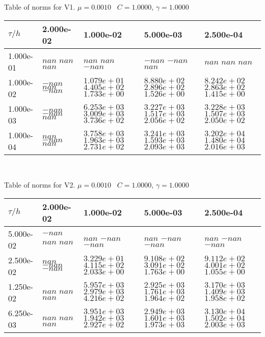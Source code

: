 \begin{center}
	Table of norms for V1. $\mu = 0.0010$ \, $C = 1.0000$, $\gamma = 1.0000$
	
	\begin{tabular}{|p{1in}|p{1in}|p{1in}|p{1in}|p{1in}|} \hline
		$\tau / h$ &2.000e-02 &1.000e-02 &5.000e-03 &2.500e-04 \\ \hline 
		1.000e-01 & $nan$  $nan$  $nan$  & $nan$  $nan$  $-nan$  & $-nan$  $-nan$  $nan$  & $nan$  $nan$  $nan$  \\ \hline 
		1.000e-02 & $-nan$  $nan$  $-nan$  & $1.079e+01$  $4.405e+02$  $1.733e+00$  & $8.880e+02$  $2.896e+02$  $1.526e+00$  & $8.242e+02$  $2.863e+02$  $1.415e+00$  \\ \hline 
		1.000e-03 & $-nan$  $-nan$  $nan$  & $6.253e+03$  $3.009e+03$  $3.736e+02$  & $3.227e+03$  $1.517e+03$  $2.056e+02$  & $3.228e+03$  $1.507e+03$  $2.050e+02$  \\ \hline 
		1.000e-04 & $nan$  $-nan$  $nan$  & $3.758e+03$  $1.963e+03$  $2.731e+02$  & $3.241e+03$  $1.593e+03$  $2.093e+03$  & $3.202e+04$  $1.480e+04$  $2.016e+03$  \\ \hline 
		
	\end{tabular}\\[20pt]
\end{center}

\newpage
\begin{center}
	Table of norms for V2. $\mu = 0.0010$ \, $C = 1.0000$, $\gamma = 1.0000$
	
	\begin{tabular}{|p{1in}|p{1in}|p{1in}|p{1in}|p{1in}|} \hline
		$\tau / h$ &2.000e-02 &1.000e-02 &5.000e-03 &2.500e-04 \\ \hline 
		5.000e-02 & $-nan$  $nan$  $nan$  & $nan$  $-nan$  $-nan$  & $nan$  $-nan$  $-nan$  & $nan$  $-nan$  $-nan$  \\ \hline 
		2.500e-02 & $nan$  $-nan$  $-nan$  & $3.229e+01$  $4.115e+02$  $2.033e+00$  & $9.108e+02$  $3.091e+02$  $1.763e+00$  & $9.112e+02$  $4.001e+02$  $1.055e+00$  \\ \hline 
		1.250e-02 & $nan$  $nan$  $nan$  & $5.957e+03$  $2.979e+03$  $4.216e+02$  & $2.925e+03$  $1.761e+03$  $1.964e+02$  & $3.170e+03$  $1.409e+03$  $1.958e+02$  \\ \hline 
		6.250e-03 & $nan$  $nan$  $nan$  & $3.951e+03$  $1.942e+03$  $2.927e+02$  & $2.949e+03$  $1.601e+03$  $1.973e+03$  & $3.130e+04$  $1.502e+04$  $2.003e+03$  \\ \hline 
		
	\end{tabular}\\[20pt]
\end{center}


